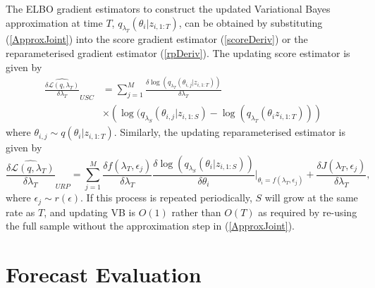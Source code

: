 \documentclass[12pt,a4paper]{article}\usepackage[]{graphicx}\usepackage[]{color}
\begin{document}
The ELBO gradient estimators to construct the updated Variational Bayes approximation at time $T$,  $q_{\lambda_T}(\theta_{i} | z_{i, 1:T})$, can be obtained by substituting (\ref{ApproxJoint}) into the score gradient estimator (\ref{scoreDeriv}) or the reparameterised gradient estimator (\ref{rpDeriv}). The updating score estimator is given by
\begin{align}
\widehat{\frac{\delta\mathcal{L}(q, \lambda_T)}{\delta \lambda_T}}_{USC} &= \sum_{j = 1}^M \frac{\delta \log(q_{\lambda_T}(\theta_{i, j} | z_{i, 1:T}))}{\delta \lambda_T} \nonumber \\
&\times \left(\log(q_{\lambda_S}(\theta_{i, j} | z_{i, 1:S}) - \log(q_{\lambda_T}(\theta_{i} z_{i, 1:T})) \right) \label{scoreUpdate}
\end{align}
where $\theta_{i, j} \sim q(\theta_{i} | z_{i, 1:T})$. Similarly, the updating reparameterised estimator is given by
\begin{equation}
\label{rpUpdate}
\widehat{\frac{\delta\mathcal{L}(q, \lambda_T)}{\delta \lambda_T}}_{URP} = \sum_{j = 1}^M \frac{\delta f(\lambda_T, \epsilon_j)}{\delta \lambda_T} \frac{\delta \log(q_{\lambda_S}(\theta_{i} |z_{i, 1:S}))}{\delta \theta_{i}} \bigg\rvert_{\theta_{i} = f(\lambda_T, \epsilon_j)} + \frac{\delta J(\lambda_T, \epsilon_j)}{\delta \lambda_T},
\end{equation}
where $\epsilon_j \sim r(\epsilon)$. If this process is repeated periodically, $S$ will grow at the same rate as $T$, and updating VB is $O(1)$ rather than $O(T)$ as required by re-using the full sample without the approximation step in (\ref{ApproxJoint}).

\section{Forecast Evaluation}
\label{sec:eval}
\end{document}

